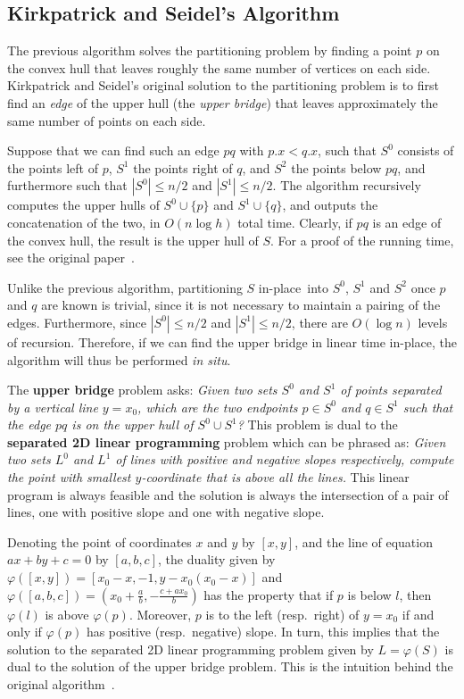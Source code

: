 \documentclass{elsart}
\newcommand{\insitu}{\emph{in situ}}
\newcommand{\inplace}{in-place}
\begin{document}
\subsection{Kirkpatrick and Seidel's Algorithm}

The previous algorithm solves the partitioning problem by finding a
point $p$ on the convex hull that leaves roughly the same number of
vertices on each side.  Kirkpatrick and Seidel's original solution to
the partitioning problem is to first find an \emph{edge} of the upper
hull (the \emph{upper bridge}) that leaves approximately the same
number of points on each side.

Suppose that we can find such an edge $pq$ with $p.x < q.x$, such that
$S^0$ consists of the points left of $p$, $S^1$ the points right of
$q$, and $S^2$ the points below $pq$, and furthermore such that
$|S^0|\leq n/2$ and $|S^1|\leq n/2$.  The algorithm recursively
computes the upper hulls of $S^0\cup\{p\}$ and $S^1\cup\{q\}$, and
outputs the concatenation of the two, in $O(n\log h)$ total
time. Clearly, if $pq$ is an edge of the convex hull, the result is
the upper hull of $S$. For a proof of the running time, see the
original paper~\cite{ks86}.

Unlike the previous algorithm, partitioning $S$ \inplace\ into $S^0$,
$S^1$ and $S^2$ once $p$ and $q$ are known is trivial, since it is not
necessary to maintain a pairing of the edges.  Furthermore, since
$|S^0|\leq n/2$ and $|S^1|\leq n/2$, there are $O(\log n)$ levels of
recursion.  Therefore, if we can find the upper bridge in linear time
\inplace, the algorithm will thus be performed \insitu.

The \textbf{upper bridge} problem asks: \emph{Given two sets $S^0$ and
$S^1$ of points separated by a vertical line $y=x_0$, which are the
two endpoints $p\in S^0$ and $q\in S^1$ such that the edge $pq$ is on
the upper hull of $S^0\cup S^1$?} This problem is dual to the
\textbf{separated 2D linear programming} problem which can be phrased
as: \emph{Given two sets $L^0$ and $L^1$ of lines with positive and
negative slopes respectively, compute the point with smallest
$y$-coordinate that is above all the lines.}  This linear program is
always feasible and the solution is always the intersection of a pair
of lines, one with positive slope and one with negative slope.

\newcommand{\dual}{\varphi}

Denoting the point of coordinates $x$ and $y$ by $[x,y]$, and the line
of equation $ax+by+c=0$ by $[a,b,c]$, the duality given by
$\dual([x,y])=[x_0-x,-1,y-x_0(x_0-x)]$ and
$\dual([a,b,c])=(x_0+\frac{a}{b},-\frac{c+ax_0}{b})$ has the property
that if $p$ is below $l$, then $\dual(l)$ is above $\dual(p)$.
Moreover, $p$ is to the left (resp.\ right) of $y=x_0$ if and only if
$\dual(p)$ has positive (resp.\ negative) slope.  In turn, this
implies that the solution to the separated 2D linear programming
problem given by $L=\dual(S)$ is dual to the solution of the upper
bridge problem. This is the intuition behind the original
algorithm~\cite{ks86}.
\end{document}
